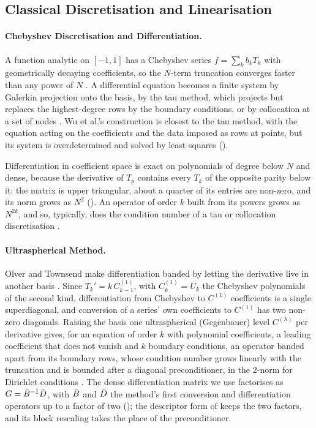 \subsection{Classical Discretisation and Linearisation}
\label{sec:bg-spectral}

\paragraph{Chebyshev Discretisation and Differentiation.}
\label{sec:bg-chebyshev}

A function analytic on $[-1,1]$ has a Chebyshev series $f=\sum_kb_kT_k$ with geometrically decaying coefficients, so the $N$-term truncation converges faster than any power of $N$ \cite{trefethen2013approximation}. A differential equation becomes a finite system by Galerkin projection onto the basis, by the tau method, which projects but replaces the highest-degree rows by the boundary conditions, or by collocation at a set of nodes \cite{canuto2006spectral,boyd2001Chebyshev}. Wu et al.'s construction is closest to the tau method, with the equation acting on the coefficients and the data imposed as rows at points, but its system is overdetermined and solved by least squares ().

Differentiation in coefficient space is exact on polynomials of degree below $N$ and dense, because the derivative of $T_p$ contains every $T_k$ of the opposite parity below it: the matrix is upper triangular, about a quarter of its entries are non-zero, and its norm grows as $N^2$ (). An operator of order $k$ built from its powers grows as $N^{2k}$, and so, typically, does the condition number of a tau or collocation discretisation \cite{olver2013,canuto2006spectral}.

\paragraph{Ultraspherical Method.}
\label{sec:bg-ultraspherical}

Olver and Townsend make differentiation banded by letting the derivative live in another basis \cite{olver2013}. Since $T_k'=k\,C^{(1)}_{k-1}$, with $C^{(1)}_k=U_k$ the Chebyshev polynomials of the second kind, differentiation from Chebyshev to $C^{(1)}$ coefficients is a single superdiagonal, and conversion of a series' own coefficients to $C^{(1)}$ has two non-zero diagonals. Raising the basis one ultraspherical (Gegenbauer) level $C^{(\lambda)}$ per derivative gives, for an equation of order $k$ with polynomial coefficients, a leading coefficient that does not vanish and $k$ boundary conditions, an operator banded apart from its boundary rows, whose condition number grows linearly with the truncation and is bounded after a diagonal preconditioner, in the 2-norm for Dirichlet conditions \cite{olver2013}. The dense differentiation matrix we use factorises as $G=\tilde{B}^{-1}\tilde{D}$, with $\tilde{B}$ and $\tilde{D}$ the method's first conversion and differentiation operators up to a factor of two (); the descriptor form of  keeps the two factors, and its block rescaling takes the place of the preconditioner.

